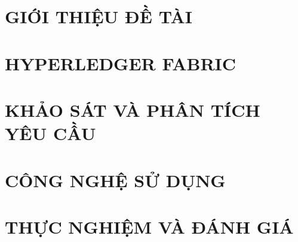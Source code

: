 \documentclass[a4paper,13pt,3p,twoside]{report}
\renewcommand{\bibname}{Danh_sach_tai_lieu_tham_khao}
\theoremstyle{definition}
\begin{document}

\newpage
{}


\newpage
{}



\newpage
{}

\pagestyle{fancy}
\fancyhf{}
\fancyhead[RE, LO]{\leftmark}
\fancyfoot[RE, LO]{\thepage}

\chapter{GIỚI THIỆU ĐỀ TÀI}
\label{chapter:Introduction}

\newpage
\chapter{HYPERLEDGER FABRIC}
\label{chapter:Fabric}


\newpage
\chapter{KHẢO SÁT VÀ PHÂN TÍCH YÊU CẦU}
\label{chapter:Related_works}


\newpage
\chapter{CÔNG NGHỆ SỬ DỤNG}
\label{chapter:Methodology}


\newpage
\chapter{THỰC NGHIỆM VÀ ĐÁNH GIÁ}
\label{chapter:Experiment}

\end{document}

